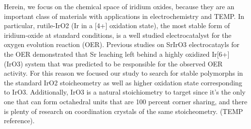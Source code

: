 

Herein, we focus on the chemical space of iridium oxides,
because they are an important class of materials with applications in electrochemistry and TEMP.
%
In particular, rutile-IrO2 (Ir in a [4+] oxidation state), the most stable form of iridium-oxide at standard conditions, is a well studied electrocatalyst for the oxygen evolution reaction (OER).
Previous studies on SrIrO3 electrocatayls for the OER demonstrated that Sr leaching left behind a highly oxidized Ir[6+] (IrO3) system that was predicted to be responsible for the observed OER activity.
%
For this reason we focused our study to search for stable polymorphs in the standard IrO2 stoicheometry as well as higher oxidation state corresponding to IrO3.
Additionally, IrO3 is a natural stoichiometry to target since it's the only one that can form octahedral units that are 100 percent corner sharing, and there is plenty of research on coordination crystals of the same stoicheometry. (TEMP reference).




